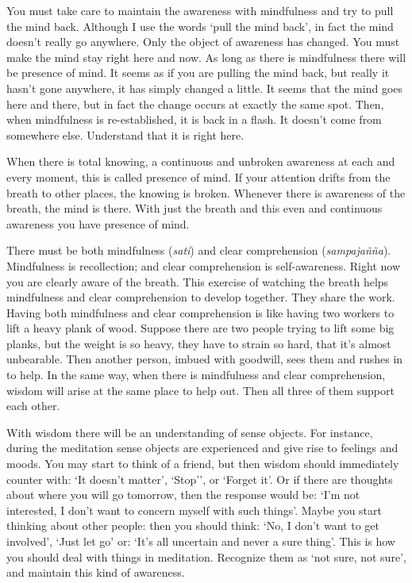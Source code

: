 You must take care to maintain the awareness with mindfulness and try to pull the mind back. Although I use the words `pull the mind back', in fact the mind doesn't really go anywhere. Only the object of awareness has changed. You must make the mind stay right here and now. As long as there is mindfulness there will be presence of mind. It seems as if you are pulling the mind back, but really it hasn't gone anywhere, it has simply changed a little. It seems that the mind goes here and there, but in fact the change occurs at exactly the same spot. Then, when mindfulness is re-established, it is back in a flash. It doesn't come from somewhere else. Understand that it is right here.

When there is total knowing, a continuous and unbroken awareness at each and every moment, this is called presence of mind. If your attention drifts from the breath to other places, the knowing is broken. Whenever there is awareness of the breath, the mind is there. With just the breath and this even and continuous awareness you have presence of mind.

There must be both mindfulness (\textit{sati}) and clear comprehension (\textit{sampajañña}). Mindfulness is recollection; and clear comprehension is self-awareness. Right now you are clearly aware of the breath. This exercise of watching the breath helps mindfulness and clear comprehension to develop together. They share the work. Having both mindfulness and clear comprehension is like having two workers to lift a heavy plank of wood. Suppose there are two people trying to lift some big planks, but the weight is so heavy, they have to strain so hard, that it's almost unbearable. Then another person, imbued with goodwill, sees them and rushes in to help. In the same way, when there is mindfulness and clear comprehension, wisdom will arise at the same place to help out. Then all three of them support each other.

With wisdom there will be an understanding of sense objects. For instance, during the meditation sense objects are experienced and give rise to feelings and moods. You may start to think of a friend, but then wisdom should immediately counter with: `It doesn't matter', `Stop'', or `Forget it'. Or if there are thoughts about where you will go tomorrow, then the response would be: `I'm not interested, I don't want to concern myself with such things'. Maybe you start thinking about other people: then you should think: `No, I don't want to get involved', `Just let go' or: `It's all uncertain and never a sure thing'. This is how you should deal with things in meditation. Recognize them as `not sure, not sure', and maintain this kind of awareness.

